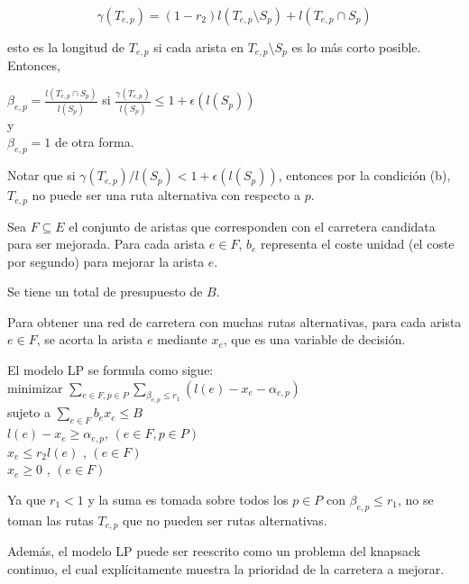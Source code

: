 \documentclass[10pt]{report}
\begin{document}
$$
\gamma\left(T_{e,p}\right) = \left( 1 - r_{2} \right) l \left(T_{e,p} \setminus S_{p} \right) + 
l \left(T_{e,p}  \cap   S_{p} \right)
$$
 
esto es la longitud de $T_{e,p}$ si cada arista en $T_{e,p} \setminus S_{p}$ es lo más corto posible. Entonces,

$\beta_{e,p} = \frac{l \left( T_{e,p}  \cap   S_{p}  \right)}    {l \left( S_{p} \right)}$ si $\frac{\gamma\left(T_{e,p}\right)}{l \left( S_{p} \right)} \leq 1 + \epsilon  \left( l  \left( S_{p}   \right) \right) $ \\
y \\
$\beta_{e,p} = 1$ de otra forma.
 
Notar que si $\gamma \left( T_{e,p} \right) / l \left( S_{p} \right) <1 +  \epsilon  \left( l  \left( S_{p}   \right) \right)$, entonces por la condición (b), $ T_{e,p}$ no puede ser una ruta alternativa con respecto a $p$.

Sea $F \subseteq E$ el conjunto de aristas que corresponden con el carretera candidata para ser mejorada.
Para cada arista $e \in F$, $b_{e}$ representa el coste unidad (el coste por segundo) para mejorar la arista $e$.

Se tiene un total de presupuesto de $B$.

Para obtener una red de carretera con muchas rutas alternativas, para cada arista $e \in F$, se acorta la arista $e$ mediante $x_{e}$, que es una variable de decisión.

El modelo LP se formula como sigue:\\
minimizar $\sum_{e \in F, p \in P } \sum_{\beta_{e,p} \leq r_{1}}   \left( l \left( e \right) - x_{e} - \alpha_{e,p}\right) $ \\
sujeto a $\sum_{e\in F} b_{e}x_{e} \leq B$ \\

$l \left( e \right) - x_{e} \geq \alpha_{e,p}$,    $\left( e  \in F, p \in P\right)$\\
$x_{e} \leq  r_{2}l  \left( e \right)$ , $\left( e  \in F\right)$\\
$x_{e} \geq 0$ ,                         $\left( e  \in F\right)$

Ya que $r_{1} < 1$ y la suma es tomada sobre todos los $p \in P$ con $\beta_{e,p}  \leq r_{1}$, no se toman las rutas $T_{e,p}$ que no pueden ser rutas alternativas.

Además, el modelo LP puede ser reescrito como un problema del knapsack continuo, el cual explícitamente muestra la prioridad de la carretera a mejorar.
\end{document}
